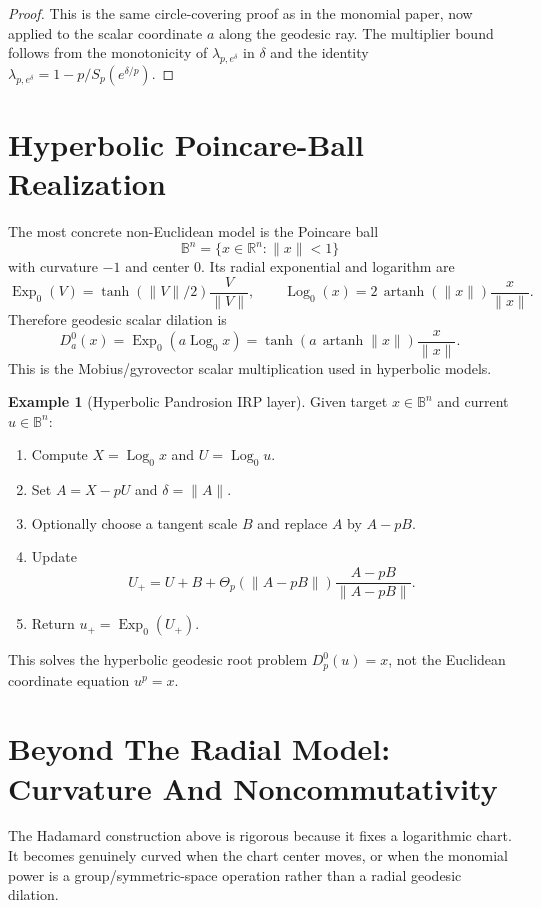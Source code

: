 \documentclass[10pt,a4paper]{article}
\theoremstyle{plain}
\theoremstyle{definition}
\newtheorem{example}[theorem]{Example}
\theoremstyle{remark}
\newcommand{\R}{\mathbb{R}}
\newcommand{\Exp}{\operatorname{Exp}}
\newcommand{\Log}{\operatorname{Log}}
\begin{document}
\begin{proof}
This is the same circle-covering proof as in the monomial paper, now applied to
the scalar coordinate $a$ along the geodesic ray.  The multiplier bound follows
from the monotonicity of $\lambda_{p,e^\delta}$ in $\delta$ and the identity
$\lambda_{p,e^\delta}=1-p/S_p(e^{\delta/p})$.
\end{proof}

\section{Hyperbolic Poincare-Ball Realization}

The most concrete non-Euclidean model is the Poincare ball
\[
  \mathbb B^n=\{x\in\R^n:\|x\|<1\}
\]
with curvature $-1$ and center $0$.  Its radial exponential and logarithm are
\[
  \Exp_0(V)=\tanh(\|V\|/2)\frac{V}{\|V\|},
  \qquad
  \Log_0(x)=2\,\operatorname{artanh}(\|x\|)
          \frac{x}{\|x\|}.
\]
Therefore geodesic scalar dilation is
\[
  D_a^0(x)
    =\Exp_0(a\Log_0 x)
    =
    \tanh\!\left(a\,\operatorname{artanh}\|x\|\right)\frac{x}{\|x\|}.
\]
This is the Mobius/gyrovector scalar multiplication used in hyperbolic models.

\begin{example}[Hyperbolic Pandrosion IRP layer]
Given target $x\in\mathbb B^n$ and current $u\in\mathbb B^n$:
\begin{enumerate}
  \item Compute $X=\Log_0 x$ and $U=\Log_0 u$.
  \item Set $A=X-pU$ and $\delta=\|A\|$.
  \item Optionally choose a tangent scale $B$ and replace $A$ by $A-pB$.
  \item Update
  \[
    U_+=U+B+\Theta_p(\|A-pB\|)
      \frac{A-pB}{\|A-pB\|}.
  \]
  \item Return $u_+=\Exp_0(U_+)$.
\end{enumerate}
This solves the hyperbolic geodesic root problem
$D_p^0(u)=x$, not the Euclidean coordinate equation $u^p=x$.
\end{example}

\section{Beyond The Radial Model: Curvature And Noncommutativity}

The Hadamard construction above is rigorous because it fixes a logarithmic chart.
It becomes genuinely curved when the chart center moves, or when the monomial
power is a group/symmetric-space operation rather than a radial geodesic
dilation.
\end{document}
